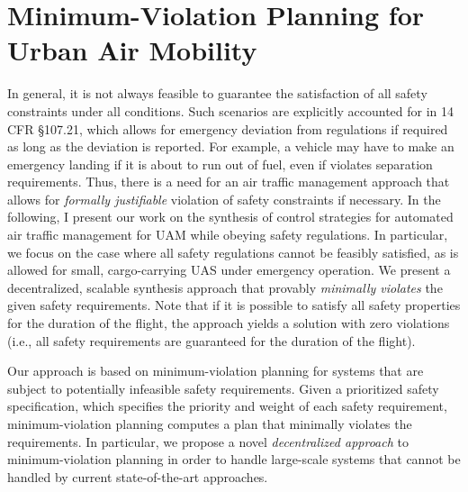 \chapter{Minimum-Violation Planning for Urban Air Mobility}
In general, it is not always feasible to guarantee the satisfaction of all safety constraints under all conditions. Such scenarios are explicitly accounted for in 14 CFR \S 107.21, which allows for emergency deviation from regulations if required as long as the deviation is reported. For example, a vehicle may have to make an emergency landing if it is about to run out of fuel, even if violates separation requirements. Thus, there is a need for an air traffic management approach that allows for \emph{formally justifiable} violation of safety constraints if necessary. In the following, I present our work on the synthesis of control strategies for automated air traffic management for UAM while obeying safety regulations. In particular, we focus on the case where all safety regulations cannot be feasibly satisfied, as is allowed for small, cargo-carrying UAS under emergency operation. We present a decentralized, scalable synthesis approach that provably \emph{minimally violates} the given safety requirements.  Note that if it is possible to satisfy all safety properties for the duration of the flight, the approach yields a solution with zero violations (i.e., all safety requirements are guaranteed for the duration of the flight). 

Our approach is based on minimum-violation planning for systems that are subject to potentially infeasible safety requirements. Given a prioritized safety specification, which specifies the priority and weight of each safety requirement, minimum-violation planning computes a plan that minimally violates the requirements. In particular, we propose a novel \emph{decentralized approach} to minimum-violation planning in order to handle large-scale systems that cannot be handled by current state-of-the-art approaches. 

%
%


%



